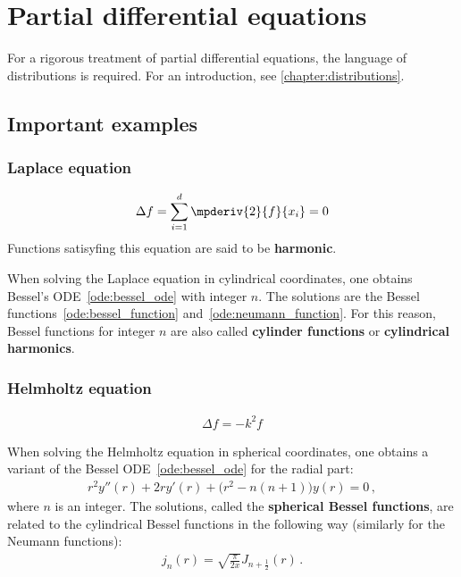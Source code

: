 \chapter{Partial differential equations}\label{chapter:pde}

    For a rigorous treatment of partial differential equations, the language of distributions is required. For an introduction, see \cref{chapter:distributions}.

\section{Important examples}
\subsection{Laplace equation}

    \begin{example}\label{pde:laplace_equation}
        \begin{gather}
            \Delta f = \sum_{i=1}^d\mpderiv{2}{f}{x_i}=0
        \end{gather}
        Functions satisyfing this equation are said to be \textbf{harmonic}.
    \end{example}

    When solving the Laplace equation in cylindrical coordinates, one obtains Bessel's ODE~\eqref{ode:bessel_ode} with integer $n$. The solutions are the Bessel functions~\eqref{ode:bessel_function} and~\eqref{ode:neumann_function}. For this reason, Bessel functions for integer $n$ are also called \textbf{cylinder functions} or \textbf{cylindrical harmonics}.

\subsection{Helmholtz equation}

    \begin{example}\label{pde:helmholtz_equation}
        \begin{gather}
            \Delta f = -k^2f
        \end{gather}
    \end{example}

    When solving the Helmholtz equation in spherical coordinates, one obtains a variant of the Bessel ODE~\eqref{ode:bessel_ode} for the radial part:
    \begin{gather}
        r^2y''(r) + 2ry'(r) + \bigl(r^2 - n(n+1)\bigr)y(r) = 0\,,
    \end{gather}
    where $n$ is an integer. The solutions, called the \textbf{spherical Bessel functions}, are related to the cylindrical Bessel functions in the following way (similarly for the Neumann functions):
    \begin{gather}
        j_n(r) = \sqrt{\frac{\pi}{2x}}J_{n + \frac{1}{2}}(r)\,.
    \end{gather}

